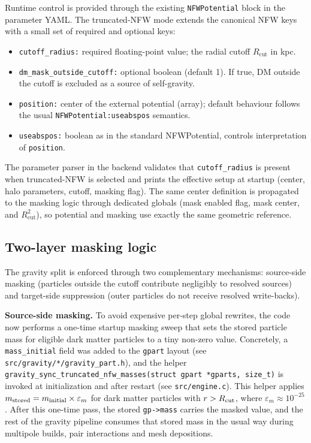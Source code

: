 Runtime control is provided through the existing \texttt{NFWPotential} block in the parameter YAML. The truncated-NFW mode extends the canonical NFW keys with a small set of required and optional keys:

\begin{itemize}
\item \texttt{cutoff\_radius:} required floating-point value; the radial cutoff $R_{\mathrm{cut}}$ in kpc.
\item \texttt{dm\_mask\_outside\_cutoff:} optional boolean (default 1). If true, DM outside the cutoff is excluded as a source of self-gravity.
\item \texttt{position:} center of the external potential (array); default behaviour follows the usual \texttt{NFWPotential:useabspos} semantics.
\item \texttt{useabspos:} boolean as in the standard NFWPotential, controls interpretation of \texttt{position}.
\end{itemize}

The parameter parser in the backend validates that \texttt{cutoff\_radius} is present when truncated-NFW is selected and prints the effective setup at startup (center, halo parameters, cutoff, masking flag). The same center definition is propagated to the masking logic through dedicated globals (mask enabled flag, mask center, and $R_{\mathrm{cut}}^2$), so potential and masking use exactly the same geometric reference.

\subsection{Two-layer masking logic}

The gravity split is enforced through two complementary mechanisms: source-side masking (particles outside the cutoff contribute negligibly to resolved sources) and target-side suppression (outer particles do not receive resolved write-backs).

\textbf{Source-side masking.} To avoid expensive per-step global rewrites, the code now performs a one-time startup masking sweep that sets the stored particle mass for eligible dark matter particles to a tiny non-zero value. Concretely, a \texttt{mass\_initial} field was added to the \texttt{gpart} layout (see \texttt{src/gravity/*/gravity\_part.h}), and the helper
\texttt{gravity\_sync\_truncated\_nfw\_masses(struct gpart *gparts, size\_t)} is invoked at initialization and after restart (see \texttt{src/engine.c}). This helper applies
\(m_{\rm stored} = m_{\rm initial}\times\varepsilon_m\) for dark matter particles with $r>R_{\rm cut}$, where $\varepsilon_m\approx10^{-25}$. After this one-time pass, the stored \texttt{gp->mass} carries the masked value, and the rest of the gravity pipeline consumes that stored mass in the usual way during multipole builds, pair interactions and mesh depositions.

